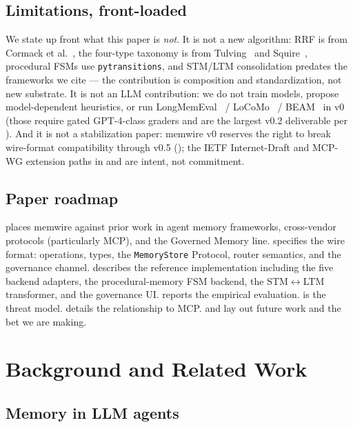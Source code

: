 \documentclass[11pt,letterpaper,twocolumn]{article}
\begin{document}
\subsection{Limitations, front-loaded}
\label{sec:intro-limitations}

We state up front what this paper is \emph{not}. It is not a new algorithm: RRF is from Cormack et al.~\cite{cormack2009rrf}, the four-type taxonomy is from Tulving~\cite{tulving1972episodic} and Squire~\cite{squire1992declarative}, procedural FSMs use \texttt{pytransitions}, and STM/LTM consolidation predates the frameworks we cite --- the contribution is composition and standardization, not new substrate. It is not an LLM contribution: we do not train models, propose model-dependent heuristics, or run LongMemEval~\cite{wu2024longmemeval} / LoCoMo~\cite{maharana2024locomo} / BEAM~\cite{beam_benchmark} in v0 (those require gated GPT-4-class graders and are the largest v0.2 deliverable per ). And it is not a stabilization paper: memwire v0 reserves the right to break wire-format compatibility through v0.5 (); the IETF Internet-Draft and MCP-WG extension paths in  and  are intent, not commitment.

\subsection{Paper roadmap}
\label{sec:intro-roadmap}

 places memwire against prior work in agent memory frameworks, cross-vendor protocols (particularly MCP), and the Governed Memory line.  specifies the wire format: operations, types, the \texttt{MemoryStore} Protocol, router semantics, and the governance channel.  describes the reference implementation including the five backend adapters, the procedural-memory FSM backend, the STM$\leftrightarrow$LTM transformer, and the governance UI.  reports the empirical evaluation.  is the threat model.  details the relationship to MCP.  and  lay out future work and the bet we are making.

\section{Background and Related Work}
\label{sec:related}

\subsection{Memory in LLM agents}
\end{document}
